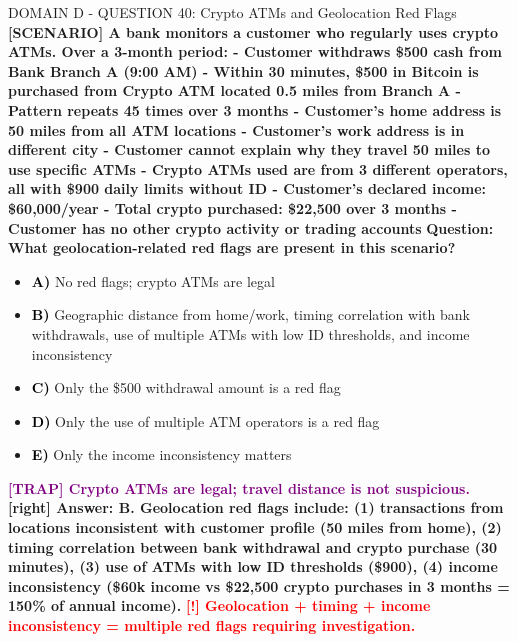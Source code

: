 \documentclass[11pt,a4paper]{beamer}
\newcommand{\redflag}[1]{\textcolor{red}{\textbf{[!] #1}}}
\newcommand{\trap}[1]{\textcolor{purple}{\textbf{[TRAP] #1}}}
\newcommand{\correct}[1]{\textcolor{green!50!black}{\textbf{[right] #1}}}
\newcommand{\scenario}[1]{\textcolor{blue!70!black}{\textbf{[SCENARIO] #1}}}
\newcommand{\option}[1]{\textcolor{black}{\textbf{#1}}}
\begin{document}
\begin{frame}{DOMAIN D - QUESTION 40: Crypto ATMs and Geolocation Red Flags}
\scenario{A bank monitors a customer who regularly uses crypto ATMs. Over a 3-month period:
- Customer withdraws \$500 cash from Bank Branch A (9:00 AM)
- Within 30 minutes, \$500 in Bitcoin is purchased from Crypto ATM located 0.5 miles from Branch A
- Pattern repeats 45 times over 3 months
- Customer's home address is 50 miles from all ATM locations
- Customer's work address is in different city
- Customer cannot explain why they travel 50 miles to use specific ATMs
- Crypto ATMs used are from 3 different operators, all with \$900 daily limits without ID
- Customer's declared income: \$60,000/year
- Total crypto purchased: \$22,500 over 3 months
- Customer has no other crypto activity or trading accounts}
\vspace{0.2cm}
\textbf{Question: What geolocation-related red flags are present in this scenario?}
\vspace{0.1cm}
\begin{itemize}
    \item \option{A)} No red flags; crypto ATMs are legal
    \item \option{B)} Geographic distance from home/work, timing correlation with bank withdrawals, use of multiple ATMs with low ID thresholds, and income inconsistency
    \item \option{C)} Only the \$500 withdrawal amount is a red flag
    \item \option{D)} Only the use of multiple ATM operators is a red flag
    \item \option{E)} Only the income inconsistency matters
\end{itemize}
\vspace{0.2cm}
\trap{Crypto ATMs are legal; travel distance is not suspicious.}
\correct{Answer: B. Geolocation red flags include: (1) transactions from locations inconsistent with customer profile (50 miles from home), (2) timing correlation between bank withdrawal and crypto purchase (30 minutes), (3) use of ATMs with low ID thresholds (\$900), (4) income inconsistency (\$60k income vs \$22,500 crypto purchases in 3 months = 150\% of annual income).}
\redflag{Geolocation + timing + income inconsistency = multiple red flags requiring investigation.}
\end{frame}
\end{document}
